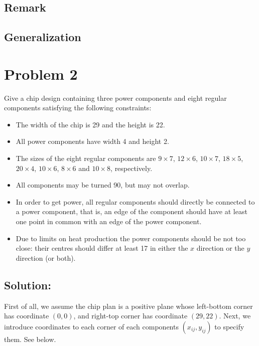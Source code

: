 \documentclass[11pt]{article}
\begin{document}
\subsection*{Remark}


\subsection*{Generalization}



\section*{Problem 2}

Give a chip design containing three power components and eight regular components satisfying the following constraints:
\begin{itemize}
  \item The width of the chip is 29 and the height is 22.
  \item All power components have width 4 and height 2.
  \item The sizes of the eight regular components are $9 \times 7$, $12 \times 6$, $10 \times 7$, $18 \times 5$, $20 \times 4$, $10 \times 6$, $8 \times 6$ and $10 \times 8$, respectively.
  \item All components may be turned 90, but may not overlap.
  \item In order to get power, all regular components should directly be connected to a power component, that is, an edge of the component should have at least one point in common with an edge of the power component.
  \item Due to limits on heat production the power components should be not too close: their centres should differ at least 17 in either the $x$ direction or the $y$ direction (or both).
\end{itemize}

\vspace{4mm}

\subsection*{Solution:}
First of all, we assume the chip plan is a positive plane whose left-bottom corner has coordinate $(0, 0)$, and right-top corner has coordinate $(29, 22)$.
Next, we introduce coordinates to each corner of each components $(x_{ij}, y_{ij})$ to specify them.
See below.
\end{document}
